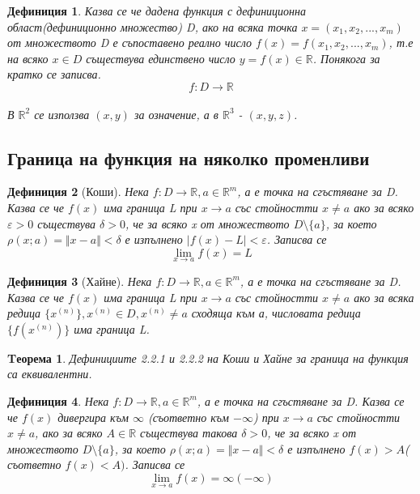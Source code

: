 \documentclass[a4paper,fleqn,12pt]{article}
\newtheorem{theorem}{Tеорема}[subsection]
\newtheorem{definition}{Дефиниция}[subsection]
\theoremstyle{definition}
\begin{document}
\begin{definition}
Казва се че дадена функция с дефиниционна област(дефиниционно множество) D, ако на всяка точка $x = (x_1, x_2, ... , x_m)$ от множеството D е съпоставено реално число $f(x) = f(x_1, x_2, ... , x_m)$, т.е на всяко $x \in D$ съществува единствено число $y = f(x) \in \mathbb{R}$. Понякога за кратко се записва. 
$$f: D \to \mathbb{R} $$\\
В $\mathbb{R}^2$ се използва $(x,y)$ за означение, а в $\mathbb{R}^3$ - $(x,y,z)$.
\end{definition}

\subsection{Граница на функция на няколко променливи}

\begin{definition}[Коши]
Нека $f: D \to \mathbb{R}, a \in \mathbb{R}^m$, а е точка на сгъстяване за D. Казва се че $f(x)$ има граница L при $x \to a$ със стойностти $x \neq a$ ако за всяко $\varepsilon > 0$ съществува $\delta > 0$, че за всяко x от множеството $D \setminus \{a\}$, за което $\rho(x;a) = \Vert x - a \Vert < \delta $ е изпълнено $\vert f(x) - L \vert  < \varepsilon$. Записва се $$\lim\limits_{x \to a} f(x) = L$$
\end{definition}

\begin{definition}[Хайне]
Нека $f: D \to\mathbb{R}, a \in \mathbb{R}^m$, а е точка на сгъстяване за D. Казва се че $f(x)$ има граница L при $x \to a$ със стойностти $x \neq a$ ако за всяка редица  $\{x^{(n)}\} ,x^{(n)} \in D, x^{(n)} \neq a$ сходяща към а, числовата редица $\{f(x^{(n)})\}$ има граница L. 
\end{definition}

\begin{theorem}
Дефинициите 2.2.1 и 2.2.2 на Коши и Хайне за граница на функция са еквивалентни.
\end{theorem}

\begin{definition}
Нека $f: D \to \mathbb{R}, a \in \mathbb{R}^m$, а е точка на сгъстяване за D. Казва се че $f(x)$ дивергира към $\infty$ (съответно към $-\infty$) при $x \to a$ със стойностти $x \neq a$, ако за всяко $A \in \mathbb{R}$ съществува такова $\delta > 0$, че за всяко x от множеството $D \setminus \{a\}$, за което $\rho(x;a) = \Vert x - a \Vert < \delta $ е изпълнено $f(x) > A $( съответно $f(x) < A)$. Записва се
 $$\lim\limits_{x \to a} f(x) = \infty (-\infty) $$ 
\end{definition}
\end{document}
